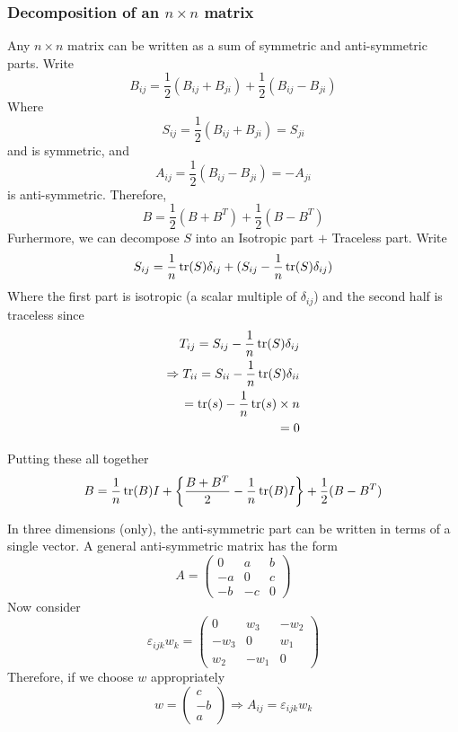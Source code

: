 \documentclass{article}
\numberwithin{equation}{section}
\begin{document}
\subsubsection{Decomposition of an $n \times n$ matrix}
Any $n \times n$ matrix can be written as a sum of symmetric and anti-symmetric parts. Write
\[
    B_{ij} = \frac{1}{2}(B_{ij} + B_{ji}) + \frac{1}{2}(B_{ij} - B_{ji})
\]
Where
\[
    S_{ij} = \frac{1}{2}(B_{ij} + B_{ji}) = S_{ji}
\]
and is symmetric, and
\[
    A_{ij} = \frac{1}{2}(B_{ij} - B_{ji}) = -A_{ji}
\]
is anti-symmetric. Therefore,
\begin{equation}\label{eq:3-17}
    B = \frac{1}{2}(B + B^T) + \frac{1}{2}(B - B^T)
\end{equation}
Furhermore, we can decompose $S$ into an Isotropic part $+$ Traceless part. Write
\[
    S_{ij} = \frac{1}{n}\operatorname{tr}(S)\delta_{ij} + (S_{ij} - \frac{1}{n}\operatorname{tr}(S)\delta_{ij})
\]
Where the first part is isotropic (a scalar multiple of $\delta_{ij}$) and the second half is traceless since
\begin{align*}
    T_{ij} = S_{ij} - \frac{1}{n}\operatorname{tr}(S)\delta_{ij} \\
    \Rightarrow T_{ii} = S_{ii} - \frac{1}{n}\operatorname{tr}(S)\delta_{ii} \\
    =\operatorname{tr}(s) - \frac{1}{n}\operatorname{tr}(s) \times n \\
    = 0
\end{align*}

Putting these all together
\begin{equation}\label{eq:3-18}
    B = \frac{1}{n}\operatorname{tr}(B)I + \left\{ \frac{B + B^T}{2} - \frac{1}{n}\operatorname{tr}(B)I \right\} + \frac{1}{2}(B - B^T)
\end{equation}

In three dimensions (only), the anti-symmetric part can be written in terms of a single vector. 
A general anti-symmetric matrix has the form
\[
    A = \begin{pmatrix}
    0 & a & b \\
    -a & 0 & c \\
    -b & -c & 0
    \end{pmatrix}
\]
Now consider
\[
    \varepsilon_{ijk}w_k = \begin{pmatrix}
        0 & w_3 & -w_2 \\
        -w_3 & 0 & w_1 \\
        w_2 & -w_1 & 0
    \end{pmatrix}
\]
Therefore, if we choose $w$ appropriately
\[
    w = \begin{pmatrix}
    c \\ -b \\ a
    \end{pmatrix}
    \Rightarrow A_{ij} = \varepsilon_{ijk}w_k
\]
\end{document}
